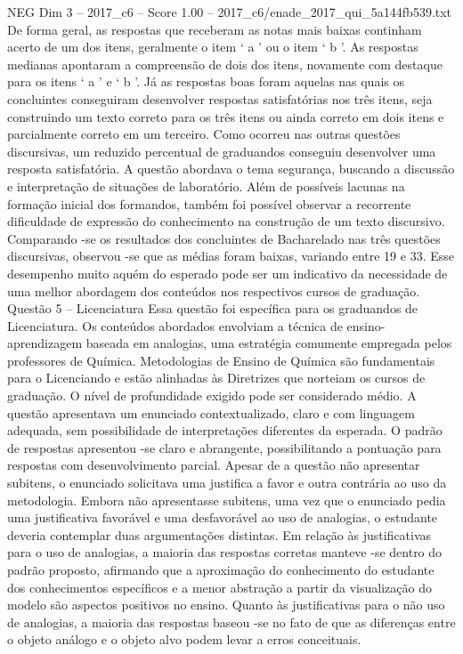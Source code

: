\begin{textsample}{NEG Dim 3 – 2017\_c6 – Score 1.00 – 2017\_c6/enade\_2017\_qui\_5a144fb539.txt}
De forma geral, as respostas que receberam as notas mais baixas continham acerto de um dos itens, geralmente o item ‘ a ’ ou o item ‘ b ’.
As respostas medianas apontaram a compreensão de dois dos itens, novamente com destaque para os itens ‘ a ’ e ‘ b ’.
Já as respostas boas foram aquelas nas quais os concluintes conseguiram desenvolver respostas satisfatórias nos três itens, seja construindo um texto correto para os três itens ou ainda correto em dois itens e parcialmente correto em um terceiro.
Como ocorreu nas outras questões discursivas, um reduzido percentual de graduandos conseguiu desenvolver uma resposta satisfatória.
A questão abordava o tema segurança, buscando a discussão e interpretação de situações de laboratório.
Além de possíveis lacunas na formação inicial dos formandos, também foi possível observar a recorrente dificuldade de expressão do conhecimento na construção de um texto discursivo.
Comparando -se os resultados dos concluintes de Bacharelado nas três questões discursivas, observou -se que as médias foram baixas, variando entre 19 e 33.
Esse desempenho muito aquém do esperado pode ser um indicativo da necessidade de uma melhor abordagem dos conteúdos nos respectivos cursos de graduação.
Questão 5 – Licenciatura Essa questão foi específica para os graduandos de Licenciatura.
Os conteúdos abordados envolviam a técnica de ensino-aprendizagem baseada em analogias, uma estratégia comumente empregada pelos professores de Química.
Metodologias de Ensino de Química são fundamentais para o Licenciando e estão alinhadas às Diretrizes que norteiam os cursos de graduação.
O nível de profundidade exigido pode ser considerado médio.
A questão apresentava um enunciado contextualizado, claro e com linguagem adequada, sem possibilidade de interpretações diferentes da esperada.
O padrão de respostas apresentou -se claro e abrangente, possibilitando a pontuação para respostas com desenvolvimento parcial.
Apesar de a questão não apresentar subitens, o enunciado solicitava uma justifica a favor e outra contrária ao uso da metodologia.
Embora não apresentasse subitens, uma vez que o enunciado pedia uma justificativa favorável e uma desfavorável ao uso de analogias, o estudante deveria contemplar duas argumentações distintas.
Em relação às justificativas para o uso de analogias, a maioria das respostas corretas manteve -se dentro do padrão proposto, afirmando que a aproximação do conhecimento do estudante dos conhecimentos específicos e a menor abstração a partir da visualização do modelo são aspectos positivos no ensino.
Quanto às justificativas para o não uso de analogias, a maioria das respostas baseou -se no fato de que as diferenças entre o objeto análogo e o objeto alvo podem levar a erros conceituais.

\end{textsample}
